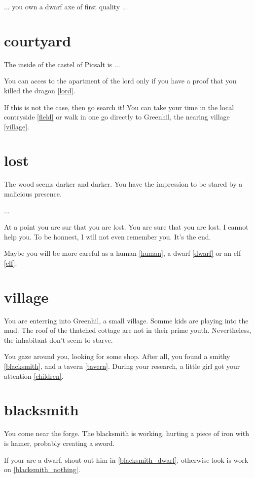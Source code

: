 ... you own a dwarf axe of first quality ...

\section{courtyard}

The inside of the castel of Picsalt is ...

You can acces to the apartment of the lord only if you have a proof that you
killed the dragon \ref{lord}.

If this is not the case, then go search it! You can take your time in the local
contryside \ref{field} or walk in one go directly to Greenhil, the nearing
village \ref{village}.

\section{lost}

The wood seems darker and darker. You have the impression to be stared by a
malicious presence. 

...

At a point you are sur that you are lost. You are sure that you are lost. I
cannot help you. To be honnest, I will not even remember you. It's the end.

Maybe you will be more careful as a human \ref{human}, a dwarf \ref{dwarf} or an
elf \ref{elf}.

\section{village}

You are enterring into Greenhil, a small village. Somme kids are playing into
the mud. The roof of the thatched cottage are not in their prime youth.
Nevertheless, the inhabitant don't seem to starve.

You gaze around you, looking for some shop. After all, you found a smithy
\ref{blacksmith}, and a tavern \ref{tavern}. During your research, a little girl
got your attention \ref{children}.

\section{blacksmith}

You come near the forge. The blacksmith is working, hurting a piece of iron with
is hamer, probably creating a sword.

If your are a dwarf, shout out him in \ref{blacksmith_dwarf}, otherwise look is
work on \ref{blacksmith_nothing}.

